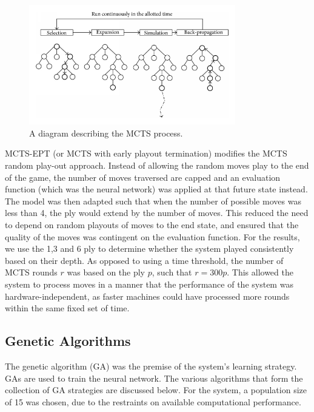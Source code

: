 \documentclass[12pt,a4paper]{article}
\begin{document}
        \begin{figure}[!ht]
            \centering
            \includegraphics[width=90mm]{images/montecarlo.png}
            \caption{A diagram describing the MCTS process.}
        \end{figure}

        MCTS-EPT (or MCTS with early playout termination) modifies the MCTS random play-out approach. Instead of allowing the random moves play to the end of the game, the number of moves traversed are capped and an evaluation function (which was the neural network) was applied at that future state instead. \cite{lorentz_using_2016} The model was then adapted such that when the number of possible moves was less than 4, the ply would extend by the number of moves. This reduced the need to depend on random playouts of moves to the end state, and ensured that the quality of the moves was contingent on the evaluation function. For the results, we use the 1,3 and 6 ply to determine whether the system played consistently based on their depth. As opposed to using a time threshold, the number of MCTS rounds $r$ was based on the ply $p$, such that $r=300p$. This allowed the system to process moves in a manner that the performance of the system was hardware-independent, as faster machines could have processed more rounds within the same fixed set of time.


    \subsection{Genetic Algorithms}
        The genetic algorithm (GA) was the premise of the system's learning strategy. GAs are used to train the neural network. The various algorithms that form the collection of GA strategies are discussed below. For the system, a population size of 15 was chosen, due to the restraints on available computational performance.
\end{document}
